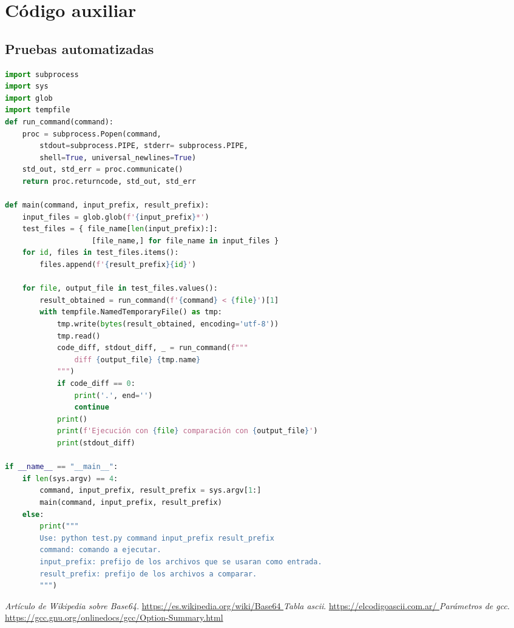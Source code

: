 \documentclass[titlepage,a4paper]{article}
\begin{document}
\section{Código auxiliar}
\subsection{Pruebas automatizadas}
\label{script_python_test}
\begin{lstlisting}[language=Python]
import subprocess
import sys
import glob
import tempfile
def run_command(command):
    proc = subprocess.Popen(command, 
        stdout=subprocess.PIPE, stderr= subprocess.PIPE, 
        shell=True, universal_newlines=True)
    std_out, std_err = proc.communicate()
    return proc.returncode, std_out, std_err

def main(command, input_prefix, result_prefix):
    input_files = glob.glob(f'{input_prefix}*')
    test_files = { file_name[len(input_prefix):]: 
                    [file_name,] for file_name in input_files }
    for id, files in test_files.items():
        files.append(f'{result_prefix}{id}')
    
    for file, output_file in test_files.values():
        result_obtained = run_command(f'{command} < {file}')[1]
        with tempfile.NamedTemporaryFile() as tmp:
            tmp.write(bytes(result_obtained, encoding='utf-8'))
            tmp.read()
            code_diff, stdout_diff, _ = run_command(f"""
                diff {output_file} {tmp.name}
            """)
            if code_diff == 0:
                print('.', end='')
                continue 
            print()
            print(f'Ejecución con {file} comparación con {output_file}')
            print(stdout_diff)
            
if __name__ == "__main__":
    if len(sys.argv) == 4:
        command, input_prefix, result_prefix = sys.argv[1:]
        main(command, input_prefix, result_prefix)
    else:
        print("""
        Use: python test.py command input_prefix result_prefix
        command: comando a ejecutar.
        input_prefix: prefijo de los archivos que se usaran como entrada.
        result_prefix: prefijo de los archivos a comparar.
        """)
\end{lstlisting}

\newpage
\begin{thebibliography}{9}

\textit{Artículo de Wikipedia sobre Base64}. 
\href {https://es.wikipedia.org/wiki/Base64}{
https://es.wikipedia.org/wiki/Base64
}
\textit{Tabla ascii}. 
\href {https://elcodigoascii.com.ar/}{
https://elcodigoascii.com.ar/
}
\textit{Parámetros de gcc}. 
\href {https://gcc.gnu.org/onlinedocs/gcc/Option-Summary.html}{
https://gcc.gnu.org/onlinedocs/gcc/Option-Summary.html
}
\end{thebibliography}
\end{document}
